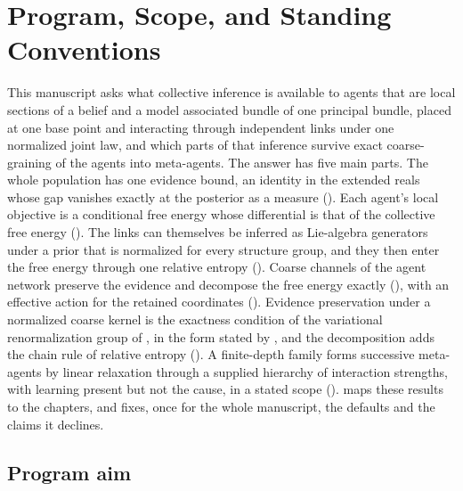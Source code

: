 \chapter{Program, Scope, and Standing Conventions}
\label{ch:introduction}

This manuscript asks what collective inference is available to agents that are local sections of a
belief and a model associated bundle of one principal bundle, placed at one base point and interacting
through independent links under one normalized joint law, and which parts of that inference survive
exact coarse-graining of the agents into meta-agents. The answer has five main parts. The whole
population has one evidence bound, an identity in the extended reals whose gap vanishes exactly at the
posterior as a measure (). Each agent's local
objective is a conditional free energy whose differential is that of the collective free energy
(). The links can themselves be inferred as Lie-algebra generators
under a prior that is normalized for every structure group, and they then enter the free energy through
one relative entropy (). Coarse
channels of the agent network preserve the evidence and
decompose the free energy exactly (), with an effective action for the
retained coordinates (). Evidence preservation under a normalized coarse
kernel is the exactness condition of the variational renormalization group of
\citet{KadanoffHoughtonYalabik1976}, in the form stated by \citet[Eqs.~(8)--(9)]{MehtaSchwab2014}, and
the decomposition adds the chain rule of relative entropy (). A
finite-depth family forms successive meta-agents by linear relaxation through a supplied hierarchy of
interaction strengths, with learning present but not the cause, in a stated scope
().  maps these results to the
chapters, and  fixes, once for the whole manuscript, the defaults and the
claims it declines.

\section{Program aim}
\label{sec:intro-program-aim}

